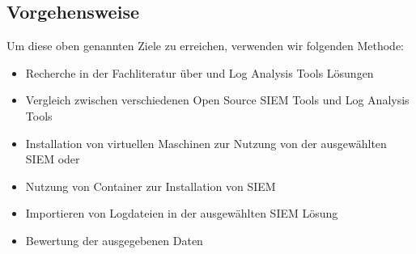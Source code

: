 \subsection{Vorgehensweise}
Um diese oben genannten Ziele zu erreichen, verwenden wir folgenden Methode:

\begin{itemize}[noitemsep]
   \item Recherche in der Fachliteratur über  und Log Analysis Tools Lösungen
   \item Vergleich zwischen verschiedenen \gls{Open Source} \gls{SIEM} Tools und Log Analysis Tools
   \item Installation von virtuellen Maschinen zur Nutzung von der ausgewählten \gls{SIEM} oder  
   \item Nutzung von Container zur Installation von \gls{SIEM}
   \item Importieren von Logdateien in der ausgewählten \gls{SIEM} Lösung
   \item Bewertung der ausgegebenen Daten
\end{itemize}

